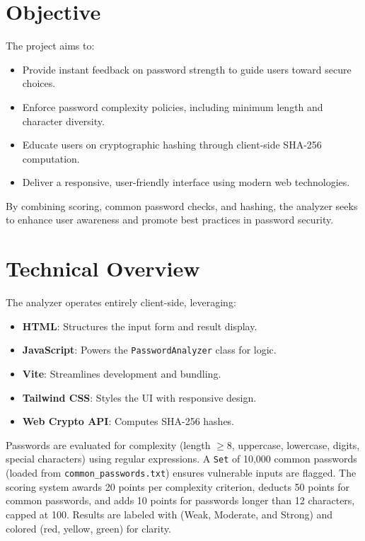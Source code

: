 \documentclass[11pt,a4paper]{report}
\begin{document}
\section{Objective}
The project aims to:
\begin{itemize}
    \item Provide instant feedback on password strength to guide users toward secure choices.
    \item Enforce password complexity policies, including minimum length and character diversity.
    \item Educate users on cryptographic hashing through client-side SHA-256 computation.
    \item Deliver a responsive, user-friendly interface using modern web technologies.
\end{itemize}
By combining scoring, common password checks, and hashing, the analyzer seeks to enhance user awareness and promote best practices in password security.

\section{Technical Overview}
The analyzer operates entirely client-side, leveraging:
\begin{itemize}
    \item \textbf{HTML}: Structures the input form and result display.
    \item \textbf{JavaScript}: Powers the \texttt{PasswordAnalyzer} class for logic.
    \item \textbf{Vite}: Streamlines development and bundling.
    \item \textbf{Tailwind CSS}: Styles the UI with responsive design.
    \item \textbf{Web Crypto API}: Computes SHA-256 hashes.
\end{itemize}
Passwords are evaluated for complexity (length $\geq 8$, uppercase, lowercase, digits, special characters) using regular expressions. A \texttt{Set} of 10,000 common passwords (loaded from \texttt{common\_passwords.txt}) ensures vulnerable inputs are flagged. The scoring system awards 20 points per complexity criterion, deducts 50 points for common passwords, and adds 10 points for passwords longer than 12 characters, capped at 100. Results are labeled with (Weak, Moderate, and Strong) and colored (red, yellow, green) for clarity.
\pagebreak
\end{document}
